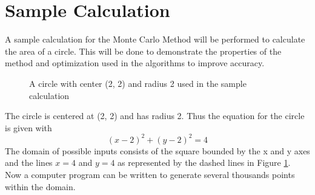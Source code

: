 \documentclass[10pt, letterpaper]{article}
\begin{document}
  \section{Sample Calculation} \label{sec:usage}

  A sample calculation for the Monte Carlo Method will be performed to calculate the area of a circle. This will be done to demonstrate the properties of
  the method and optimization used in the algorithms to improve accuracy.

  \begin{figure}
    \centering
    \caption{A circle with center (2, 2) and radius 2 used in the sample calculation} \label{fig:circle}
  \end{figure}

  The circle is centered at (2, 2) and has radius 2. Thus the equation for the circle is given with
  \[ (x-2)^2 + (y-2)^2 = 4 \]
  The domain of possible inputs consists of the square bounded by the x and y axes and the lines
  $x = 4$ and $y = 4$ as represented by the dashed lines in Figure \ref{fig:circle}. \\

  Now a computer program can be written to generate several thousands points within the domain.
\end{document}
